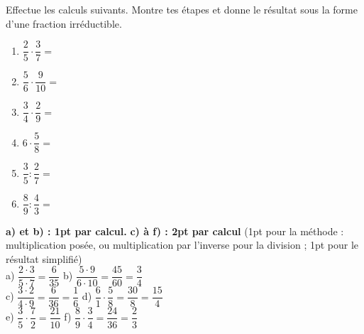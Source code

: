 
\question[10]
Effectue les calculs suivants. Montre tes étapes et donne le résultat sous la forme d'une fraction irréductible.

\vspace{10pt}

\begin{enumerate}[leftmargin=*,align=parleft, label=\alph*), itemsep=60pt]
\item $\dfrac{2}{5} \cdot \dfrac{3}{7} =$ 
\item $\dfrac{5}{6} \cdot \dfrac{9}{10} =$ 
\item $\dfrac{3}{4} \cdot \dfrac{2}{9} =$ 
\item $6 \cdot \dfrac{5}{8} =$ 
\item $\dfrac{3}{5} : \dfrac{2}{7} =$ 
\item $\dfrac{8}{9} : \dfrac{4}{3} =$ 
\end{enumerate}


\begin{solution}[0pt]
\textbf{a) et b) : 1pt par calcul.} \quad \textbf{c) à f) : 2pt par calcul} (1pt pour la méthode : multiplication posée, ou multiplication par l'inverse pour la division ; 1pt pour le résultat simplifié)\\[8pt]
a) $\dfrac{2 \cdot 3}{5 \cdot 7} = \dfrac{6}{35}$ \quad b) $\dfrac{5 \cdot 9}{6 \cdot 10} = \dfrac{45}{60} = \dfrac{3}{4}$\\[6pt]
c) $\dfrac{3 \cdot 2}{4 \cdot 9} = \dfrac{6}{36} = \dfrac{1}{6}$ \quad d) $\dfrac{6}{1} \cdot \dfrac{5}{8} = \dfrac{30}{8} = \dfrac{15}{4}$\\[6pt]
e) $\dfrac{3}{5} \cdot \dfrac{7}{2} = \dfrac{21}{10}$ \quad f) $\dfrac{8}{9} \cdot \dfrac{3}{4} = \dfrac{24}{36} = \dfrac{2}{3}$
\end{solution}